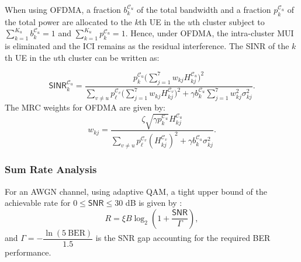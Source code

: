 \documentclass[lettersize,journal]{IEEEtran}
\begin{document}
When using \ac{OFDMA}, a fraction $b_k^{\mathcal{C}_u}$ of the total bandwidth and a fraction $p_k^{\mathcal{C}_u}$ of the total power are allocated to the $k$th \ac{UE} in the $u$th cluster subject to $\sum\limits_{k=1}^{K_u} b_k^{\mathcal{C}_u} \!=\! 1$ and $\sum\limits_{k=1}^{K_u} p_k^{\mathcal{C}_u} \!=\! 1$. Hence, under \ac{OFDMA}, the intra-cluster \ac{MUI} is eliminated and the \ac{ICI} remains as the residual interference. The \ac{SINR} of the $k$th \ac{UE} in the $u$th cluster can be written as:
%
\addtocounter{equation}{3}
\begin{equation}
    \mathsf{SINR}_k^{\mathcal{C}_u} =
    \frac{p_k^{\mathcal{C}_u} \bigg(\sum\limits_{j=1}^{7}w_{kj} H^{\mathcal{C}_u}_{kj}\bigg)^{\!2}}
    {\sum\limits_{v \neq u} p_\ell^{\mathcal{C}_v} \bigg(\sum\limits_{j=1}^{7}w_{kj} H^{\mathcal{C}_v}_{kj}\bigg)^{\!2}
    +\gamma b_k^{\mathcal{C}_u} \sum\limits_{j=1}^{7} w_{kj}^2 \sigma_{kj}^2}.
    \label{Eq:SINR_OFDMA}
\end{equation}
The \ac{MRC} weights for \ac{OFDMA} are given by:
\begin{equation}
    w_{kj} =
    \frac{\zeta\sqrt{\gamma p_k^{\mathcal{C}_u}}H^{\mathcal{C}_u}_{kj}}
    {\sum\limits_{v \neq u} p_\ell^{\mathcal{C}_v} \left(H^{\mathcal{C}_v}_{kj}\right)^{\!2}
    +\gamma b_k^{\mathcal{C}_u} \sigma_{kj}^2}.
    \label{Eq:w_kj_MRC_OFDMA}
\end{equation}

\subsubsection{Sum Rate Analysis}
For an \ac{AWGN} channel, using adaptive \ac{QAM}, a tight upper bound of the achievable rate for $0\leq\mathsf{SNR}\leq30$ dB is given by \cite{Goldsmith1997}:
%
\begin{equation}
R = \xi B\log_2\left(1+\frac{\mathsf{SNR}}{\Gamma}\right),
\label{Eq:Rate}
\end{equation}
%
and $\Gamma = -\dfrac{\ln\left(5\ \!\mathrm{BER}\right)}{1.5}$ is the \ac{SNR} gap accounting for the required \ac{BER} performance.
\end{document}

